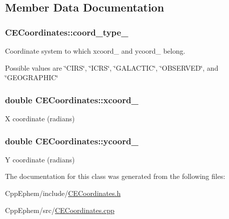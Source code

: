 \subsection{Member Data Documentation}
\hypertarget{class_c_e_coordinates_ae2ae938af879ec0aa1fb0e92537bbeed}{}
\subsubsection[{coord\+\_\+type\+\_\+}]{ C\+E\+Coordinates\+::coord\+\_\+type\+\_\+\hspace{0.3cm}{\ttfamily [protected]}}\label{class_c_e_coordinates_ae2ae938af879ec0aa1fb0e92537bbeed}


Coordinate system to which \textquotesingle{}xcoord\+\_\+\textquotesingle{} and \textquotesingle{}ycoord\+\_\+\textquotesingle{} belong. 

Possible values are \char`\"{}\+C\+I\+R\+S\char`\"{}, \char`\"{}\+I\+C\+R\+S\char`\"{}, \char`\"{}\+G\+A\+L\+A\+C\+T\+I\+C\char`\"{}, \char`\"{}\+O\+B\+S\+E\+R\+V\+E\+D\char`\"{}, and \char`\"{}\+G\+E\+O\+G\+R\+A\+P\+H\+I\+C\char`\"{} \hypertarget{class_c_e_coordinates_ab58f73988010fb779c262f7b88612fc0}{}
\subsubsection[{xcoord\+\_\+}]{\setlength{\rightskip}{0pt plus 5cm}double C\+E\+Coordinates\+::xcoord\+\_\+\hspace{0.3cm}{\ttfamily [protected]}}\label{class_c_e_coordinates_ab58f73988010fb779c262f7b88612fc0}


X coordinate (radians) 

\hypertarget{class_c_e_coordinates_ad95d1b014d83e11c93be8e74eb4957df}{}
\subsubsection[{ycoord\+\_\+}]{\setlength{\rightskip}{0pt plus 5cm}double C\+E\+Coordinates\+::ycoord\+\_\+\hspace{0.3cm}{\ttfamily [protected]}}\label{class_c_e_coordinates_ad95d1b014d83e11c93be8e74eb4957df}


Y coordinate (radians) 



The documentation for this class was generated from the following files\+:\begin{DoxyCompactItemize}
\item 
Cpp\+Ephem/include/\hyperlink{_c_e_coordinates_8h}{C\+E\+Coordinates.\+h}\item 
Cpp\+Ephem/src/\hyperlink{_c_e_coordinates_8cpp}{C\+E\+Coordinates.\+cpp}\end{DoxyCompactItemize}
